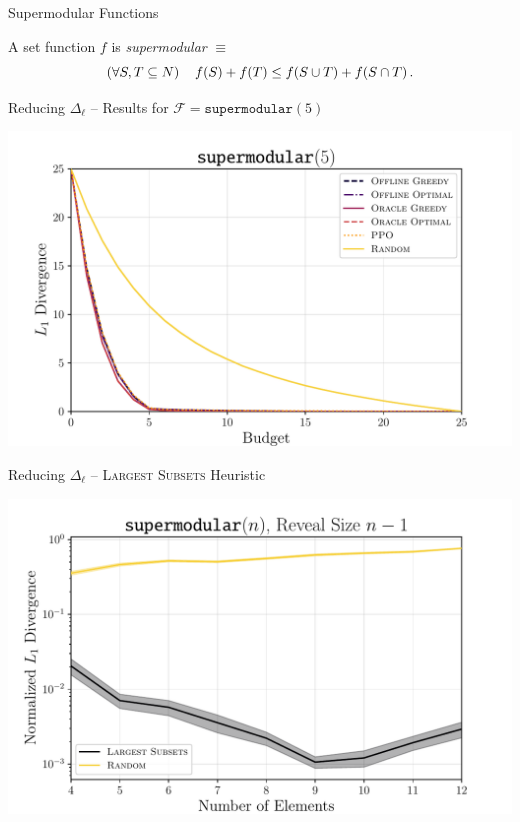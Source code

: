 \documentclass[aspectratio=169]{beamer}
\begin{document}
\begin{frame}{Supermodular Functions}
	\begin{definition}
		A set function $ f $ is \emph{supermodular} $ \equiv $ \[
			\left( \forall S,T \subseteq N \right)\quad f\!\left(S\right) + f\!\left(T\right) \leq f\!\left(S \cup T\right) + f\!\left(S \cap T\right).
		\]
	\end{definition}
	
\end{frame}

\begin{frame}{Reducing $ \Delta_\ell $ -- Results for $ \mathcal{F} = \texttt{supermodular} (5) $}
	\begin{center}
		\includegraphics[width=.8\textwidth]{figures/l1_norm_convex5.pdf}
	\end{center}
\end{frame}

\begin{frame}{Reducing $ \Delta_\ell $ -- \textsc{Largest Subsets} Heuristic}
	\begin{center}
		\includegraphics[width=.8\textwidth]{figures/l1_norm_convex_linear.pdf}
	\end{center}
\end{frame}
\end{document}
